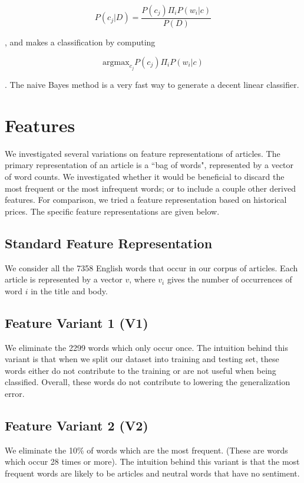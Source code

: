 \documentclass{article}
\begin{document}
$$P(c_j|D) = \dfrac{P(c_j)\Pi_i P(w_i|c)}{P(D)}$$

, and makes a classification by computing 

$$\text{argmax}_{c_j} P(c_j) \Pi_i P(w_i|c)$$

. The naive Bayes method is a very fast way to generate a decent linear classifier. 

\section{Features}

We investigated several variations on feature representations of articles. The primary representation of an article is a ``bag of words", represented by a vector of word counts. We investigated whether it would be beneficial to discard the most frequent or the most infrequent words; or to include a couple other derived features. For comparison, we tried a feature representation based on historical prices. The specific feature representations are given below.

\subsection{Standard Feature Representation} 
We consider all the 7358 English words that occur in our corpus of articles. Each article is represented by a vector $v$, where $v_i$ gives the number of occurrences of word $i$ in the title and body.

\subsection{Feature Variant 1 (V1)}
We eliminate the 2299 words which only occur once. The intuition behind this variant is that when we split our dataset into training and testing set, these words either do not contribute to the training or are not useful when being classified. Overall, these words do not contribute to lowering the generalization error. 

\subsection{Feature Variant 2 (V2)}
We eliminate the 10\% of words which are the most frequent. (These are words which occur 28 times or more). The intuition behind this variant is that the most frequent words are likely to be articles and neutral words that have no sentiment. 
\end{document}
